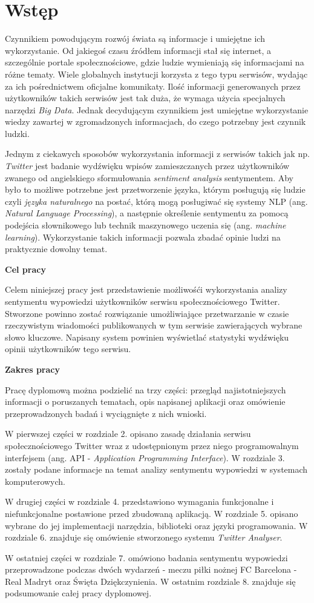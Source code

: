 \chapter{Wstęp}
\qquad Czynnikiem powodującym rozwój świata są informacje i umiejętne ich wykorzystanie. Od jakiegoś czasu źródłem informacji stał się internet, a szczególnie portale społecznościowe, gdzie ludzie wymieniają się informacjami na różne tematy. Wiele globalnych instytucji korzysta z tego typu serwisów, wydając za ich pośrednictwem oficjalne komunikaty. Ilość informacji generowanych przez użytkowników takich serwisów jest tak duża, że wymaga użycia specjalnych narzędzi \textit{Big Data}. Jednak decydującym czynnikiem jest umiejętne wykorzystanie wiedzy zawartej w zgromadzonych informacjach, do czego potrzebny jest czynnik ludzki.

Jednym z ciekawych sposobów wykorzystania informacji z serwisów takich jak np. \textit{Twitter} jest badanie wydźwięku wpisów zamieszczanych przez użytkowników zwanego od angielskiego sformułowania \textit{sentiment analysis} sentymentem. Aby było to możliwe potrzebne jest przetworzenie języka, którym posługują się ludzie czyli \textit{języka naturalnego} na postać, którą mogą posługiwać się systemy NLP (ang. \textit{Natural Language Processing}), a następnie określenie sentymentu za pomocą podejścia słownikowego lub technik maszynowego uczenia się (ang. \textit{machine learning}). Wykorzystanie takich informacji pozwala zbadać opinie ludzi na praktycznie dowolny temat.

\textbf{Cel pracy}

Celem niniejszej pracy jest przedstawienie możliwośći wykorzystania analizy sentymentu wypowiedzi użytkowników serwisu społecznościowego Twitter. Stworzone powinno zostać rozwiązanie umożliwiające przetwarzanie w czasie rzeczywistym wiadomości publikowanych w tym serwisie zawierających wybrane słowo kluczowe. Napisany system powinien wyświetlać statystyki wydźwięku opinii użytkowników tego serwisu.

\textbf{Zakres pracy}

Pracę dyplomową można podzielić na trzy części: przegląd najistotniejszych informacji o poruszanych tematach, opis napisanej aplikacji oraz omówienie przeprowadzonych badań i wyciągnięte z nich wnioski.

W pierwszej części w rozdziale 2. opisano zasadę działania serwisu społecznościowego Twitter wraz z udostępnionym przez niego programowalnym interfejsem (ang. API - \textit{Application Programming Interface}). W rozdziale 3. zostały podane informacje na temat analizy sentymentu wypowiedzi w systemach komputerowych. 

W drugiej części w rozdziale 4. przedstawiono wymagania funkcjonalne i niefunkcjonalne postawione przed zbudowaną aplikacją. W rozdziale 5. opisano wybrane do jej implementacji narzędzia, biblioteki oraz języki programowania. W rozdziale 6. znajduje się omówienie stworzonego systemu \textit{Twitter Analyser}.

W ostatniej części w rozdziale 7. omówiono badania sentymentu wypowiedzi przeprowadzone podczas dwóch wydarzeń - meczu piłki nożnej FC Barcelona - Real Madryt oraz Święta Dziękczynienia. W ostatnim rozdziale 8. znajduje się podsumowanie całej pracy dyplomowej.